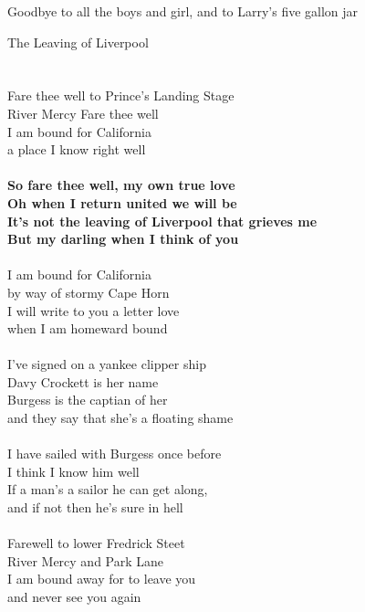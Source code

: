 \documentclass[letterpaper,9pt]{article}
\begin{document}
Goodbye to all the boys and girl, and to Larry's five gallon jar

\newpage
{}
\huge
The Leaving of Liverpool\\
\\
\Large
\\Fare thee well to Prince's Landing Stage
\\River Mercy Fare thee well
\\I am bound for California
\\a place I know right well
\\
\\\textbf{So fare thee well, my own true love
\\Oh when I return united we will be
\\It's not the leaving of Liverpool that grieves me
\\But my darling when I think of you}
\\
\\I am bound for California
\\by way of stormy Cape Horn
\\I will write to you a letter love
\\when I am homeward bound
\\
\\I've signed on a yankee clipper ship
\\Davy Crockett is her name
\\Burgess is the captian of her
\\and they say that she's a floating shame
\\
\\I have sailed with Burgess once before
\\I think I know him well
\\If a man's a sailor he can get along,
\\and if not then he's sure in hell
\\
\\Farewell to lower Fredrick Steet
\\River Mercy and Park Lane
\\I am bound away for to leave you
\\and never see you again
\end{document}
